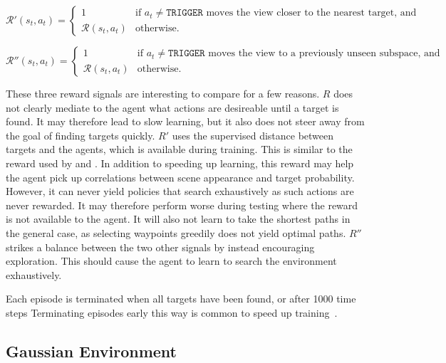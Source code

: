 \begin{equation*}
    \mathcal{R}'(s_t, a_t) =
    \begin{cases}
        1 & \text{if \(a_t \neq \mathtt{TRIGGER}\) moves the view closer to the nearest target, and} \\
        \mathcal{R}(s_t, a_t) & \text{otherwise}.
    \end{cases}
\end{equation*}

\begin{equation*}
    \mathcal{R}''(s_t, a_t) =
    \begin{cases}
        1 & \text{if \(a_t \neq \mathtt{TRIGGER}\) moves the view to a previously unseen subspace, and} \\
        \mathcal{R}(s_t, a_t) & \text{otherwise}.
    \end{cases}
\end{equation*}

These three reward signals are interesting to compare for a few reasons.
\(R\) does not clearly mediate to the agent what actions are desireable until a target is found.
It may therefore lead to slow learning, but it also does not steer away from the goal of finding targets quickly.
\(R'\) uses the supervised distance between targets and the agents, which is available during training.
This is similar to the reward used by \cite{caicedo_active_2015} and \cite{ghesu_artificial_2016}.
In addition to speeding up learning, this reward may help the agent pick up correlations between scene appearance and target probability.
However, it can never yield policies that search exhaustively as such actions are never rewarded.
It may therefore perform worse during testing where the reward is not available to the agent.
It will also not learn to take the shortest paths in the general case, as selecting waypoints greedily does not yield optimal paths.
\(R''\) strikes a balance between the two other signals by instead encouraging exploration.
This should cause the agent to learn to search the environment exhaustively.

Each episode is terminated when all targets have been found, or after 1000 time steps
Terminating episodes early this way is common to speed up training~\cite{pardo_timelimits_2022}.

\subsection{Gaussian Environment}


